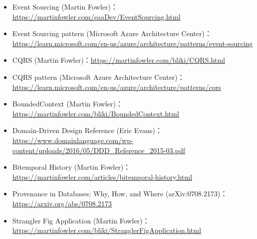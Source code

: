 \documentclass[UTF8,a4paper,11pt,fontset=fandol]{ctexart}
\begin{document}
\begin{itemize}
\item Event Sourcing (Martin Fowler)：\url{https://martinfowler.com/eaaDev/EventSourcing.html}

\item Event Sourcing pattern (Microsoft Azure Architecture Center)：\url{https://learn.microsoft.com/en-us/azure/architecture/patterns/event-sourcing}

\item CQRS (Martin Fowler)：\url{https://martinfowler.com/bliki/CQRS.html}

\item CQRS pattern (Microsoft Azure Architecture Center)：\url{https://learn.microsoft.com/en-us/azure/architecture/patterns/cqrs}

\item BoundedContext (Martin Fowler)：\url{https://martinfowler.com/bliki/BoundedContext.html}

\item Domain-Driven Design Reference (Eric Evans)：\url{https://www.domainlanguage.com/wp-content/uploads/2016/05/DDD_Reference_2015-03.pdf}

\item Bitemporal History (Martin Fowler)：\url{https://martinfowler.com/articles/bitemporal-history.html}

\item Provenance in Databases: Why, How, and Where (arXiv:0708.2173)：\url{https://arxiv.org/abs/0708.2173}

\item Strangler Fig Application (Martin Fowler)：\url{https://martinfowler.com/bliki/StranglerFigApplication.html}

\end{itemize}
\end{document}

